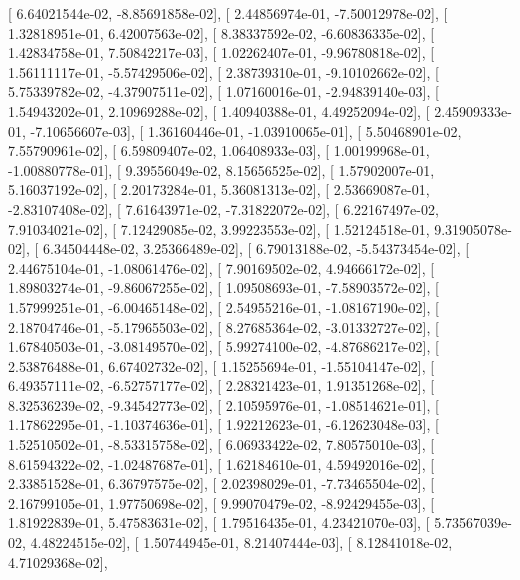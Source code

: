 \documentclass{article}
\begin{document}
       [  6.64021544e-02,  -8.85691858e-02],
       [  2.44856974e-01,  -7.50012978e-02],
       [  1.32818951e-01,   6.42007563e-02],
       [  8.38337592e-02,  -6.60836335e-02],
       [  1.42834758e-01,   7.50842217e-03],
       [  1.02262407e-01,  -9.96780818e-02],
       [  1.56111117e-01,  -5.57429506e-02],
       [  2.38739310e-01,  -9.10102662e-02],
       [  5.75339782e-02,  -4.37907511e-02],
       [  1.07160016e-01,  -2.94839140e-03],
       [  1.54943202e-01,   2.10969288e-02],
       [  1.40940388e-01,   4.49252094e-02],
       [  2.45909333e-01,  -7.10656607e-03],
       [  1.36160446e-01,  -1.03910065e-01],
       [  5.50468901e-02,   7.55790961e-02],
       [  6.59809407e-02,   1.06408933e-03],
       [  1.00199968e-01,  -1.00880778e-01],
       [  9.39556049e-02,   8.15656525e-02],
       [  1.57902007e-01,   5.16037192e-02],
       [  2.20173284e-01,   5.36081313e-02],
       [  2.53669087e-01,  -2.83107408e-02],
       [  7.61643971e-02,  -7.31822072e-02],
       [  6.22167497e-02,   7.91034021e-02],
       [  7.12429085e-02,   3.99223553e-02],
       [  1.52124518e-01,   9.31905078e-02],
       [  6.34504448e-02,   3.25366489e-02],
       [  6.79013188e-02,  -5.54373454e-02],
       [  2.44675104e-01,  -1.08061476e-02],
       [  7.90169502e-02,   4.94666172e-02],
       [  1.89803274e-01,  -9.86067255e-02],
       [  1.09508693e-01,  -7.58903572e-02],
       [  1.57999251e-01,  -6.00465148e-02],
       [  2.54955216e-01,  -1.08167190e-02],
       [  2.18704746e-01,  -5.17965503e-02],
       [  8.27685364e-02,  -3.01332727e-02],
       [  1.67840503e-01,  -3.08149570e-02],
       [  5.99274100e-02,  -4.87686217e-02],
       [  2.53876488e-01,   6.67402732e-02],
       [  1.15255694e-01,  -1.55104147e-02],
       [  6.49357111e-02,  -6.52757177e-02],
       [  2.28321423e-01,   1.91351268e-02],
       [  8.32536239e-02,  -9.34542773e-02],
       [  2.10595976e-01,  -1.08514621e-01],
       [  1.17862295e-01,  -1.10374636e-01],
       [  1.92212623e-01,  -6.12623048e-03],
       [  1.52510502e-01,  -8.53315758e-02],
       [  6.06933422e-02,   7.80575010e-03],
       [  8.61594322e-02,  -1.02487687e-01],
       [  1.62184610e-01,   4.59492016e-02],
       [  2.33851528e-01,   6.36797575e-02],
       [  2.02398029e-01,  -7.73465504e-02],
       [  2.16799105e-01,   1.97750698e-02],
       [  9.99070479e-02,  -8.92429455e-03],
       [  1.81922839e-01,   5.47583631e-02],
       [  1.79516435e-01,   4.23421070e-03],
       [  5.73567039e-02,   4.48224515e-02],
       [  1.50744945e-01,   8.21407444e-03],
       [  8.12841018e-02,   4.71029368e-02],
\end{document}
